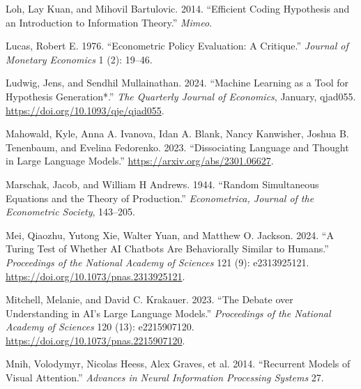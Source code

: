 \documentclass[
]{article}
\newlength{\cslhangindent}
\newenvironment{CSLReferences}[2] %
 {\begin{list}{}{%
  \setlength{\itemindent}{0pt}
  \setlength{\leftmargin}{0pt}
  \setlength{\parsep}{0pt}
  \ifodd #1
   \setlength{\leftmargin}{\cslhangindent}
   \setlength{\itemindent}{-1\cslhangindent}
  \fi
  \setlength{\itemsep}{#2\baselineskip}}}
 {\end{list}}
\begin{document}
\begin{CSLReferences}{1}{0}
Loh, Lay Kuan, and Mihovil Bartulovic. 2014. {``Efficient Coding
Hypothesis and an Introduction to Information Theory.''} \emph{Mimeo}.

Lucas, Robert E. 1976. {``Econometric Policy Evaluation: A Critique.''}
\emph{Journal of Monetary Economics} 1 (2): 19--46.

Ludwig, Jens, and Sendhil Mullainathan. 2024. {``{Machine Learning as a
Tool for Hypothesis Generation*}.''} \emph{The Quarterly Journal of
Economics}, January, qjad055. \url{https://doi.org/10.1093/qje/qjad055}.

Mahowald, Kyle, Anna A. Ivanova, Idan A. Blank, Nancy Kanwisher, Joshua
B. Tenenbaum, and Evelina Fedorenko. 2023. {``Dissociating Language and
Thought in Large Language Models.''}
\url{https://arxiv.org/abs/2301.06627}.

Marschak, Jacob, and William H Andrews. 1944. {``Random Simultaneous
Equations and the Theory of Production.''} \emph{Econometrica, Journal
of the Econometric Society}, 143--205.

Mei, Qiaozhu, Yutong Xie, Walter Yuan, and Matthew O. Jackson. 2024.
{``A Turing Test of Whether AI Chatbots Are Behaviorally Similar to
Humans.''} \emph{Proceedings of the National Academy of Sciences} 121
(9): e2313925121. \url{https://doi.org/10.1073/pnas.2313925121}.

Mitchell, Melanie, and David C. Krakauer. 2023. {``The Debate over
Understanding in AI's Large Language Models.''} \emph{Proceedings of the
National Academy of Sciences} 120 (13): e2215907120.
\url{https://doi.org/10.1073/pnas.2215907120}.

Mnih, Volodymyr, Nicolas Heess, Alex Graves, et al. 2014. {``Recurrent
Models of Visual Attention.''} \emph{Advances in Neural Information
Processing Systems} 27.


\end{CSLReferences}
\end{document}

